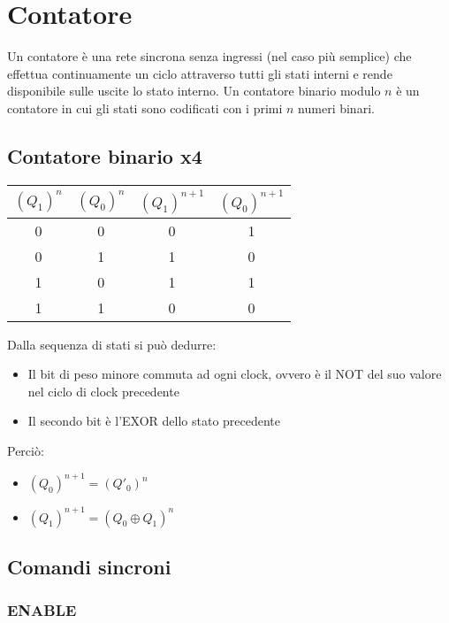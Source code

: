 \documentclass{subfiles}
\begin{document}
\section{Contatore}

Un contatore è una rete sincrona senza ingressi (nel caso più semplice) che effettua continuamente un ciclo attraverso tutti gli stati interni e rende disponibile sulle uscite lo stato interno.
Un contatore binario modulo $n$ è un contatore in cui gli stati sono codificati con i primi $n$ numeri binari.

\subsection{Contatore binario x4}

\begin{center}
\begin{tabular}{ |c|c|c|c| }
\hline
$(Q_1)^n$ & $(Q_0)^n$ & $(Q_1)^{n+1}$ & $(Q_0)^{n+1}$ \\
\hline
\hline
0 & 0 & 0 & 1 \\
0 & 1 & 1 & 0 \\
1 & 0 & 1 & 1 \\
1 & 1 & 0 & 0 \\
\hline
\end{tabular}
\end{center}

\noindent
Dalla sequenza di stati si può dedurre:

\begin{itemize}
    \item Il bit di peso minore commuta ad ogni clock, ovvero è il NOT del suo valore nel ciclo di clock precedente
    \item Il secondo bit è l'EXOR dello stato precedente
\end{itemize}

\noindent
Perciò:

\begin{itemize}
    \item $(Q_0)^{n+1} = (Q'_0)^n$
    \item $(Q_1)^{n+1} = (Q_0 \oplus Q_1)^n$
\end{itemize}

\subsection{Comandi sincroni}

\subsubsection{ENABLE}
\end{document}

